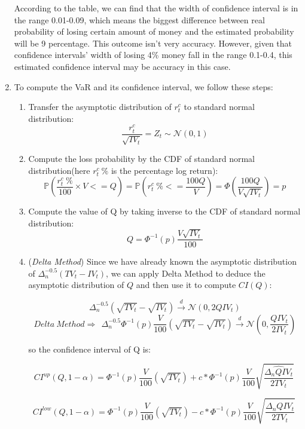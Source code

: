 \documentclass[12pt,letterpaper]{article}
\begin{document}
\begin{enumerate}[label=\textbf{(\Alph*)}]
According to the table, we can find that the width of confidence interval is in the range 0.01-0.09, which means the biggest difference between real probability of losing certain amount of money and the estimated probability will be 9 percentage. This outcome isn't very accuracy. However, given that confidence intervals' width of losing 4\% money  fall in the range 0.1-0.4, this estimated confidence interval may be accuracy in this case. 

\item To compute the VaR and its confidence interval, we follow these steps:
\begin{enumerate}[label=(\roman*)]
    \item Transfer the asymptotic distribution of $r_t^c$ to standard normal distribution:
     $$\frac{r_t^c}{\sqrt{IV_t}}=Z_t \sim \mathcal{N}(0,1)$$
\item Compute the loss probability by the CDF of standard normal distribution(here ${r_t^c ~\%}$ is the percentage log return):
     $$\mathbb{P}(\frac{r_t^c ~\%}{100}\times V<= Q)=\mathbb{P}({r_t^c ~\%}<=\frac{100Q}{V})=\Phi(\frac{100Q}{V\sqrt{IV_t}})=p$$
\item Compute the value of Q by taking inverse to the  CDF of standard normal distribution:
    $$Q=\Phi^{-1}(p)\frac{V\sqrt{IV_t}}{100}$$
\item(\emph{Delta Method}) Since we have already known the asymptotic distribution of $\Delta_n^{-0.5}(TV_t-IV_t)$, we can apply Delta Method to deduce the asymptotic distribution of $Q$ and then use it to compute $CI(Q)$:

$$\Delta_n^{-0.5}(\sqrt{TV_t}-\sqrt{IV_t}) \xrightarrow{d} \mathcal{N}(0,2QIV_t)$$
$$Delta ~Method \Rightarrow ~~ \Delta_n^{-0.5}\Phi^{-1}(p)\frac{V}{100}(\sqrt{TV_t}-\sqrt{IV_t}) \xrightarrow{d} \mathcal{N}(0,\frac{QIV_t}{2IV_t})$$

\vspace{3mm}

so the confidence interval of Q is:

\vspace{-3mm}

$$CI^{up}(Q,1-\alpha)=\Phi^{-1}(p)\frac{V}{100}(\sqrt{TV_t}) + c \ast \Phi^{-1}(p)\frac{V}{100}\sqrt{\frac{\hat{\Delta_n QIV_t}}{2TV_t}}~$$

\vspace{-5mm}

$$CI^{low}(Q,1-\alpha)=\Phi^{-1}(p)\frac{V}{100}(\sqrt{TV_t}) - c \ast \Phi^{-1}(p)\frac{V}{100}\sqrt{\frac{\hat{\Delta_n QIV_t}}{2TV_t}}~$$


\end{enumerate}
\end{enumerate}
\end{document}
